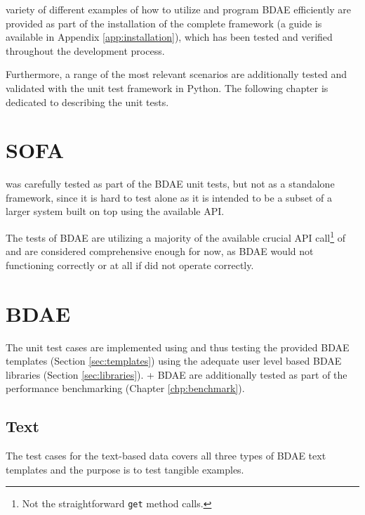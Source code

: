  variety of different examples of how to utilize and program BDAE efficiently are provided as part of the installation of the complete framework (a guide is available in Appendix \ref{app:installation}), which has been tested and verified throughout the development process. 

Furthermore, a range of the most relevant scenarios are additionally tested and validated with the unit test framework\cite{PageUnitTest} in Python. The following chapter is dedicated to describing the unit tests.

\section{SOFA}
\CodeName was carefully tested as part of the BDAE unit tests, but not as a standalone framework, since it is hard to test alone as it is intended to be a subset of a larger system built on top using the available API. 

The tests of BDAE are utilizing a majority of the available crucial API call\footnote{Not the straightforward \texttt{get} method calls.} of \CodeName and are considered comprehensive enough for now, as BDAE would not functioning correctly or at all if \CodeName did not operate correctly.

\section{BDAE}
The unit test cases are implemented using and thus testing the provided BDAE templates (Section \ref{sec:templates}) using the adequate user level based BDAE libraries (Section \ref{sec:libraries}). \CodeName + BDAE are additionally tested as part of the performance benchmarking (Chapter \ref{chp:benchmark}).

\subsection*{Text}
The test cases for the text-based data covers all three types of BDAE text templates and the purpose is to test tangible examples.

